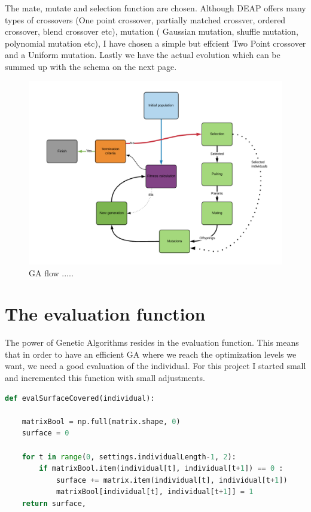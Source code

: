 \documentclass[a4paper,12pt]{report}
\begin{document}
The mate, mutate and selection function are chosen. Although DEAP offers many types of crossovers (One point crossover, partially matched crossver, ordered crossover, blend crossover etc), mutation ( Gaussian mutation, shuffle mutation, polynomial mutation etc), I have chosen a simple but effcient Two Point crossover and a Uniform mutation.
Lastly we have the actual evolution which can be summed up with the schema on the next page.
\begin{figure}[H]
    \centering
    \includegraphics[width=1\textwidth]{fig/schema}
    \caption{GA flow ..... }
    \label{fig:schema}
\end{figure}


\section{The evaluation function}
The power of Genetic Algorithms resides in the evaluation function. This means that in order to have an efficient GA where we reach the optimization levels we want, we need a good evaluation of the individual. For this project I started small and incremented this function with small adjustments.

\begin{lstlisting}[language=Python]
def evalSurfaceCovered(individual):
    
    matrixBool = np.full(matrix.shape, 0)
    surface = 0
    
    for t in range(0, settings.individualLength-1, 2):
        if matrixBool.item(individual[t], individual[t+1]) == 0 :
            surface += matrix.item(individual[t], individual[t+1])
            matrixBool[individual[t], individual[t+1]] = 1
    return surface,
\end{lstlisting}
\end{document}
